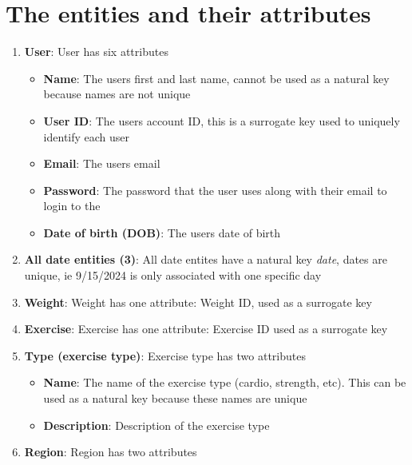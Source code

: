 \documentclass{report}
\begin{document}
    \pagebreak 

    \bigbreak \noindent 
    \section{The entities and their attributes}
    \bigbreak \noindent 
    \bigbreak \noindent 
    \begin{enumerate}
        \item \textbf{User}: User has six attributes
            \begin{itemize}
                \item \textbf{Name}: The users first and last name, cannot be used as a natural key because names are not unique
                \item \textbf{User ID}: The users account ID, this is a surrogate key used to uniquely identify each user
                \item \textbf{Email}: The users email 
                \item \textbf{Password}: The password that the user uses along with their email to login to the \approx 
                \item \textbf{Date of birth (DOB)}: The users date of birth 
            \end{itemize}
        \item \textbf{All date entities (3)}: All date entites have a natural key \textit{date}, dates are unique, ie 9/15/2024 is only associated with one specific day
        \item \textbf{Weight}: Weight has one attribute: Weight ID, used as a surrogate key
        \item \textbf{Exercise}: Exercise has one attribute: Exercise ID used as a surrogate key
        \item \textbf{Type (exercise type)}: Exercise type has two attributes
            \begin{itemize}
                \item \textbf{Name}: The name of the exercise type (cardio, strength, etc). This can be used as a natural key because these names are unique
                \item \textbf{Description}: Description of the exercise type
            \end{itemize}
        \item \textbf{Region}: Region has two attributes

\end{enumerate}
\end{document}
